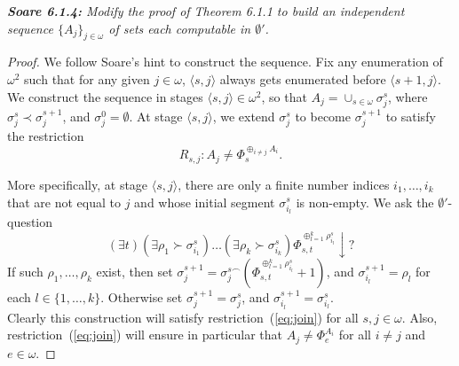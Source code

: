 \documentclass{article}
\begin{document}
\it \textbf{Soare 6.1.4:} Modify the proof of Theorem 6.1.1 to build an
  independent sequence $\{A_j\}_{j\in\omega}$ of sets each computable in
  $\emptyset'$.

  \begin{proof}
    We follow Soare's hint to construct the sequence. Fix any enumeration
    of $\omega^2$ such that for any given $j\in\omega$, $\langle
    s,j\rangle$ always gets enumerated before $\langle s+1,j\rangle$. We
    construct the sequence in stages $\langle s,j\rangle \in\omega^2$, so
    that $A_j=\cup_{s\in\omega} \sigma_{j}^s$, where $\sigma_j^s\prec
    \sigma_j^{s+1}$, and $\sigma_j^0=\emptyset$. At stage $\langle
    s,j\rangle$, we extend $\sigma_j^s$ to become $\sigma_j^{s+1}$ to satisfy
    the restriction
    \begin{equation}
      R_{s,j}: A_j \neq \Phi_s^{\oplus_{i\neq j} A_i}.
      \label{eq:join}
    \end{equation}

    More specifically, at stage $\langle s,j\rangle$, there are only a
    finite number indices $i_1,\ldots,i_k$ that are not equal to $j$ and
    whose initial segment $\sigma_{i_l}^s$ is non-empty. We ask the
    $\emptyset'$-question
    \[(\exists t) (\exists \rho_1 \succ \sigma_{i_1}^s) \ldots (\exists
    \rho_k \succ \sigma_{i_k}^s) \Phi_{s,t}^{\oplus_{l=1}^k
    \rho_{i_l}^s} \downarrow?\]
    If such $\rho_1,\ldots,\rho_k$ exist, then set $\sigma_j^{s+1}
    =\sigma_j^{s\frown}(\Phi_{s,t}^{\oplus_{l=1}^k \rho_{i_l}^s}+1)$, and
    $\sigma_{i_l}^{s+1}=\rho_l$ for each $l\in\{1,\ldots,k\}$.
    Otherwise set $\sigma_j^{s+1}=\sigma_j^{s}$, and
    $\sigma_{i_l}^{s+1} =\sigma_{i_l}^{s}$. \\

    Clearly this construction will satisfy restriction~(\ref{eq:join})
    for all $s,j\in\omega$. Also, restriction~(\ref{eq:join}) will ensure
    in particular that $A_j\neq \Phi_e^{A_i}$ for all $i\neq j$ and
    $e\in\omega$. 
  \end{proof}
\end{document}
